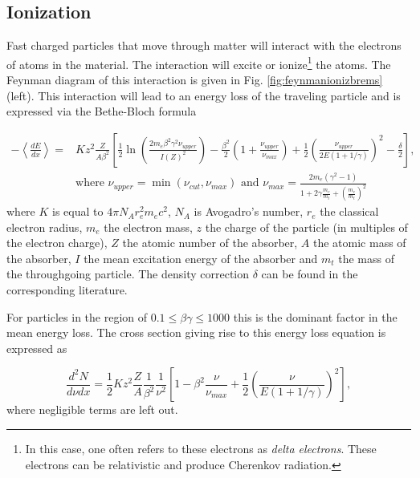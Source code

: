 \subsection{Ionization}
Fast charged particles that move through matter will interact with the electrons of atoms in the material. The interaction will excite or ionize\footnote{In this case, one often refers to these electrons as \textit{delta electrons}. These electrons can be relativistic and produce Cherenkov radiation.} the atoms. The Feynman diagram of this interaction is given in Fig. \ref{fig:feynmanionizbrems} (left). This interaction will lead to an energy loss of the traveling particle and is expressed via the Bethe-Bloch formula

\begin{equation}
\label{eq:ioniz}
\begin{split}
-\left\langle\frac{dE}{dx}\right\rangle = &K z^2 \frac{Z}{A \beta^2} \left[\frac{1}{2} \ln \left(\frac{2 m_e \beta^2 \gamma^2 \nu_{upper}}{I\left(Z\right)^2} \right) -\frac{\beta^2}{2}  \left(1+\frac{\nu_{upper}}{\nu_{max}} \right) + \frac{1}{2} \left( \frac{\nu_{upper}}{2E(1+1/\gamma)}\right)^2 - \frac{\delta}{2}\right], \\ 
&\textrm{where } \nu_{upper} = \min(\nu_{cut},\nu_{max}) \textrm{ \ \ and \ \ } \nu_{max} = \frac{2 m_e (\gamma^2 -1)}{1+2\gamma \frac{m_e}{m_t} +\left(\frac{m_e}{m_t}\right)^2}
\end{split}
\end{equation} 
where $K$ is equal to $4\pi N_A r_e^2 m_e c^2$, $N_A$ is Avogadro's number, $r_e$ the classical electron radius, $m_e$ the electron mass, $z$ the charge of the particle (in multiples of the electron charge), $Z$ the atomic number of the absorber, $A$ the atomic mass of the absorber, $I$ the mean excitation energy of the absorber and $m_t$ the mass of the throughgoing particle. The density correction $\delta$ can be found in the corresponding literature.

For particles in the region of $0.1 \leq \beta \gamma \leq 1000$ this is the dominant factor in the mean energy loss. The cross section giving rise to this energy loss equation is expressed as

\begin{equation}
\frac{d^2N}{d\nu dx} = \frac{1}{2} K z^2 \frac{Z}{A} \frac{1}{\beta^2} \frac{1}{
\nu^2} \left[1-\beta^2 \frac{\nu}{\nu_{max}} + \frac{1}{2} \left(\frac{\nu}{E(1+1/\gamma)} \right)^2 \right],
\end{equation}
where negligible terms are left out.

